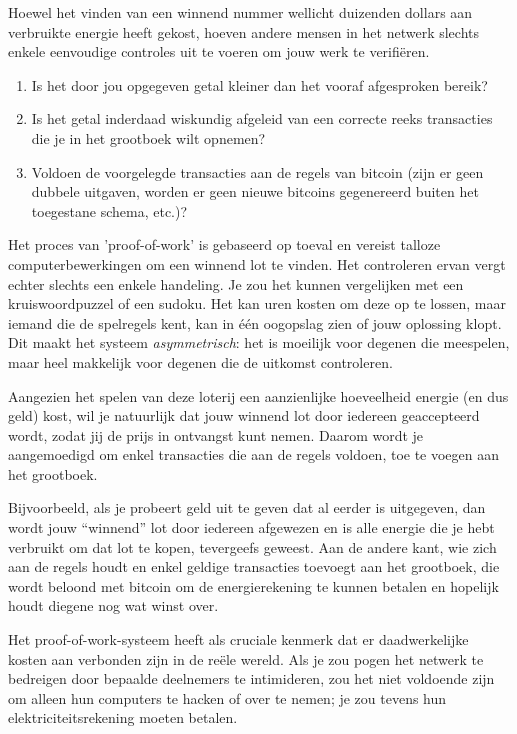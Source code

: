 Hoewel het vinden van een winnend nummer wellicht duizenden dollars aan verbruikte energie heeft gekost, hoeven andere mensen in het netwerk slechts enkele eenvoudige controles uit te voeren om jouw werk te verifiëren.

\begin{enumerate}
    \item Is het door jou opgegeven getal kleiner dan het vooraf afgesproken bereik?
    \item Is het getal inderdaad wiskundig afgeleid van een correcte reeks transacties die je in het grootboek wilt opnemen?
    \item Voldoen de voorgelegde transacties aan de regels van bitcoin (zijn er geen dubbele uitgaven, worden er geen nieuwe bitcoins gegenereerd buiten het toegestane schema, etc.)?
\end{enumerate}

Het proces van 'proof-of-work' is gebaseerd op toeval en vereist talloze computerbewerkingen om een winnend lot te vinden. Het controleren ervan vergt echter slechts een enkele handeling. Je zou het kunnen vergelijken met een kruiswoordpuzzel of een sudoku. Het kan uren kosten om deze op te lossen, maar iemand die de spelregels kent, kan in één oogopslag zien of jouw oplossing klopt. Dit maakt het systeem \textit{asymmetrisch}: het is moeilijk voor degenen die meespelen, maar heel makkelijk voor degenen die de uitkomst controleren.

Aangezien het spelen van deze loterij een aanzienlijke hoeveelheid energie (en dus geld) kost, wil je natuurlijk dat jouw winnend lot door iedereen geaccepteerd wordt, zodat jij de prijs in ontvangst kunt nemen. Daarom wordt je aangemoedigd om enkel transacties die aan de regels voldoen, toe te voegen aan het grootboek. 

Bijvoorbeeld, als je probeert geld uit te geven dat al eerder is uitgegeven, dan wordt jouw ``winnend'' lot door iedereen afgewezen en is alle energie die je hebt verbruikt om dat lot te kopen, tevergeefs geweest. Aan de andere kant, wie zich aan de regels houdt en enkel geldige transacties toevoegt aan het grootboek, die wordt beloond met bitcoin om de energierekening te kunnen betalen en hopelijk houdt diegene nog wat winst over.

Het proof-of-work-systeem heeft als cruciale kenmerk dat er daadwerkelijke kosten aan verbonden zijn in de reële wereld. Als je zou pogen het netwerk te bedreigen door bepaalde deelnemers te intimideren, zou het niet voldoende zijn om alleen hun computers te hacken of over te nemen; je zou tevens hun elektriciteitsrekening moeten betalen.


